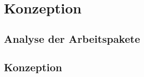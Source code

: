 \chapter{Konzeption}
\label{ch:conception}


\section{Analyse der Arbeitspakete}
\section{Konzeption}
